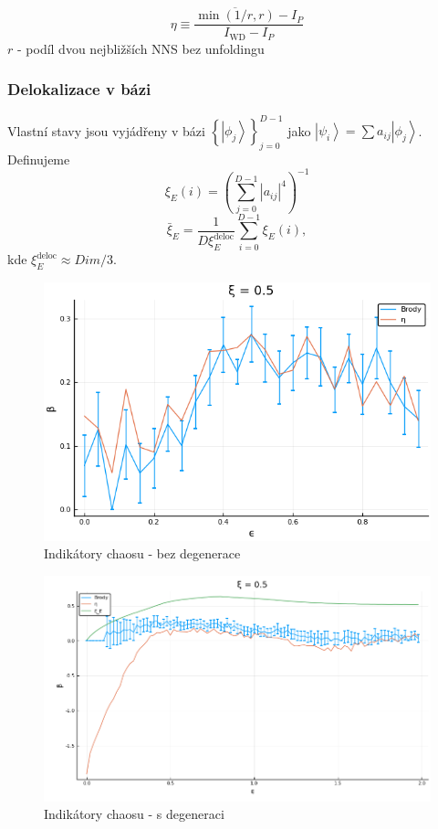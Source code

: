 \documentclass{article}
\begin{document}
  $$\eta \equiv \frac{\overline{\min (1 / r, r)}-I_{P}}{I_{\mathrm{WD}}-I_{P}}$$
  $r$ - podíl dvou nejbližších NNS bez unfoldingu
  \subsubsection{Delokalizace v bázi}
Vlastní stavy jsou vyjádřeny v bázi $\left\{\left|\phi_{j}\right\rangle\right\}_{j=0}^{D-1}$
jako $\left|\psi_{i}\right\rangle=\sum a_{i j}\left|\phi_{j}\right\rangle$. Definujeme
  $$\xi_{E}(i)=\left(\sum_{j=0}^{D-1}\left|a_{i j}\right|^{4}\right)^{-1}$$
  $$\bar{\xi}_{E}=\frac{1}{D \xi_{E}^{\mathrm{deloc}}} \sum_{i=0}^{D-1} \xi_{E}(i),$$
  kde $\xi_{E}^{\mathrm{deloc}} \approx Dim/3$.

  \begin{figure}[H]
    \centering
    \includegraphics[width=.75\linewidth]{indicators.png}
    \caption{Indikátory chaosu - bez degenerace}
\end{figure}

    \begin{figure}[H]
        \centering
        \includegraphics[width=.75\linewidth]{indicators2.png}
        \caption{Indikátory chaosu - s degeneraci}
  \end{figure}
\end{document}
